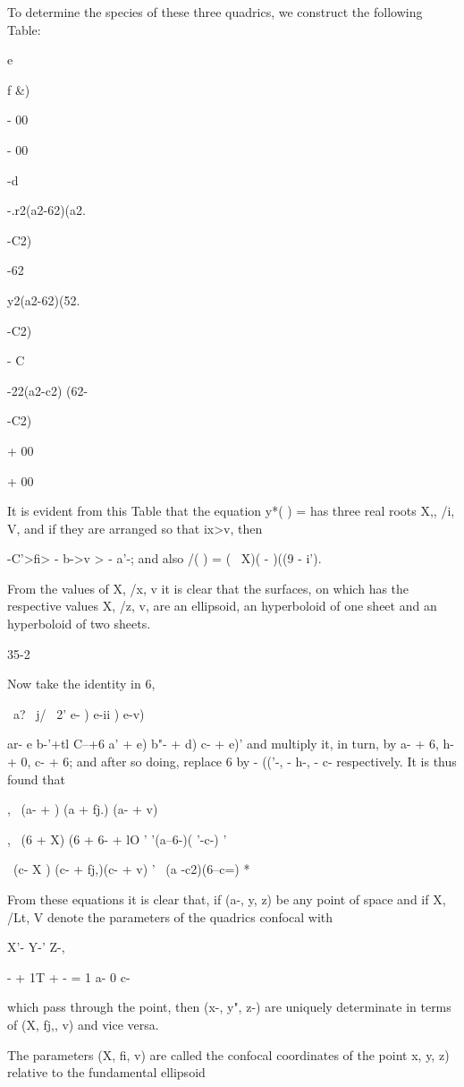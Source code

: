 {{To determine the species of these three quadrics, we construct the
following Table:

e

f \&)

- 00

- 00

-d

-.r2(a2-62)(a2.

-C2)

-62

y2(a2-62)(52.

-C2)

- C

-22(a2-c2) (62-

-C2)

+ 00

+ 00

It is evident from this Table that the equation y*( ) = has three real
roots X,, /i, V, and if they are arranged so that ix>v, then

 -C'>fi> - b->v > - a'-; and also /( ) = ( \ X)( - )((9 - i').

From the values of X, /x, v it is clear that the surfaces, on which
has the respective values X, /z, v, are an ellipsoid, an hyperboloid
of one sheet and an hyperboloid of two sheets.

35-2

%
%

Now take the identity in 6,

\ a? \ j/ \ 2' e- ) e-ii ) e-v)

ar- e b-'+tl C--+6 a' + e) b"- + d) c- + e)' and multiply it, in turn,
by a- + 6, h- + 0, c- + 6; and after so doing, replace 6 by - (('-, -
h-, - c- respectively. It is thus found that

, \ (a- + ) (a + fj.) (a- + v)

, \ (6 + X) (6 + 6- + lO ' '(a--6-)( '-c-) '

  \ (c- X ) (c- + fj,)(c- + v) '~ (a -c2)(6--c=) *

From these equations it is clear that, if (a-, y, z) be any point of
space and if X, /Lt, V denote the parameters of the quadrics confocal
with

X'- Y-' Z-,

- + 1T + - = 1 a- 0 c-

which pass through the point, then (x-, y", z-) are uniquely
determinate in terms of (X, fj,, v) and vice versa.

The parameters (X, fi, v) are called the confocal coordinates of the
point x, y, z) relative to the fundamental ellipsoid

}}
